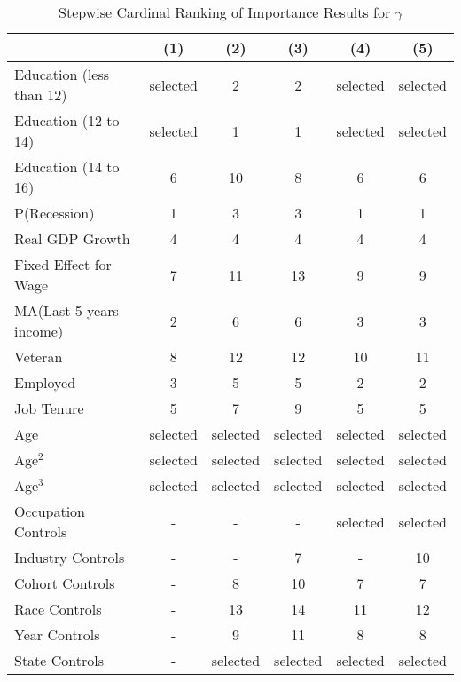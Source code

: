 \documentclass[12pt]{article}
\begin{document}
\begin{table}[H]
\centering
\caption{Stepwise Cardinal Ranking of Importance Results for $\gamma$}

\begin{tabular}{lccccc}

\toprule
                    & (1)     & (2)   & (3)    & (4)      & (5)         \\

\midrule
Education (less than 12)                & selected  & 2    & 2  & selected   & selected    \\
Education (12 to 14)                & selected  & 1    & 1  & selected   & selected    \\
Education (14 to 16)                & 6  & 10    & 8  & 6   & 6    \\
P(Recession)             & 1   & 3     & 3   & 1    & 1     \\
Real GDP Growth            & 4   & 4     & 4   & 4    & 4     \\
Fixed Effect for Wage         & 7   & 11     & 13   & 9    & 9     \\
MA(Last 5 years income)              & 2   & 6     & 6   & 3    & 3     \\
Veteran             & 8   & 12     & 12   & 10    & 11     \\
Employed                 & 3   & 5     & 5   & 2    & 2     \\
Job Tenure               & 5   & 7     & 9   & 5    & 5     \\
Age          & selected   & selected     & selected   & selected   & selected     \\
Age$^2$        & selected  & selected    & selected  & selected   & selected    \\
Age$^3$      & selected  & selected    & selected  & selected   & selected    \\

\midrule
Occupation Controls      & -   & -    & -  & selected   & selected    \\
Industry Controls      & -  & -    & 7  & -   & 10    \\
Cohort Controls      & -  & 8    & 10  & 7   & 7    \\
Race Controls      & -  & 13    & 14  & 11   & 12    \\
Year Controls      & -  & 9    & 11  & 8   & 8    \\
State Controls      & -  & selected    & selected  & selected   & selected    \\


\end{tabular}
\end{table}
\end{document}
